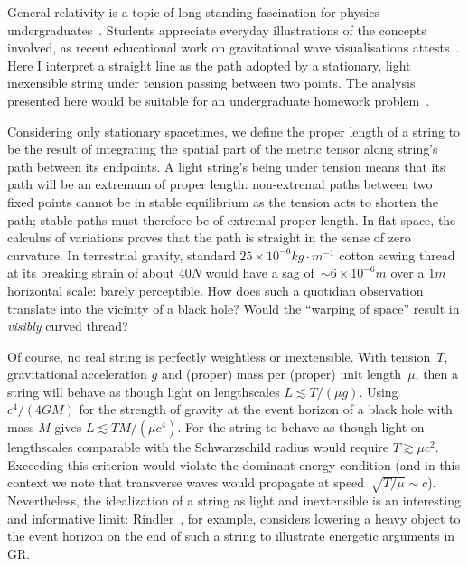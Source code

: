 \documentclass{ws-tpe}
\begin{document}
General relativity is a topic of long-standing fascination for physics
undergraduates~\cite{christensen2012}.  Students appreciate everyday
illustrations of the concepts involved, as recent educational work on
gravitational wave visualisations attests~\cite{overduin2018}.  Here I
interpret a straight line as the path adopted by a stationary, light
inexensible string under tension passing between two points.  The
analysis presented here would be suitable for an undergraduate
homework problem~\cite{romano2019}.

Considering only stationary spacetimes, we define the proper length of
a string to be the result of integrating the spatial part of the
metric tensor along string's path between its endpoints.  A light
string's being under tension means that its path will be an extremum
of proper length: non-extremal paths between two fixed points cannot
be in stable equilibrium as the tension acts to shorten the path;
stable paths must therefore be of extremal proper-length.  In flat
space, the calculus of variations proves that the path is straight in
the sense of zero curvature.  In terrestrial gravity, standard
$25\times 10^{-6}\unit{kg}\cdot\unit{m}^{-1}$ cotton sewing thread at
its breaking strain of about $40\unit{N}$ would have a sag of~${\sim}
6\times 10^{-6}\unit{m}$ over a $1\unit{m}$ horizontal scale: barely
perceptible.  How does such a quotidian observation translate into the
vicinity of a black hole?  Would the ``warping of space'' result in
{\em visibly} curved thread?

Of course, no real string is perfectly weightless or inextensible.
With tension~$T$, gravitational acceleration $g$ and (proper) mass per
(proper) unit length~$\mu$, then a string will behave as though light
on lengthscales $L\lesssim T/\left(\mu g\right)$.  Using
$c^4/\left(4GM\right)$ for the strength of gravity at the event
horizon of a black hole with mass $M$ gives $L\lesssim TM/\left(\mu
c^4\right)$.  For the string to behave as though light on lengthscales
comparable with the Schwarzschild radius would require $T\gtrsim\mu
c^2$.  Exceeding this criterion would violate the dominant energy
condition (and in this context we note that transverse waves would
propagate at speed~$\sqrt{T/\mu}\sim c$).  Nevertheless, the
idealization of a string as light and inextensible is an interesting
and informative limit: Rindler~\cite{rindler}, for example, considers
lowering a heavy object to the event horizon on the end of such a
string to illustrate energetic arguments in GR.
\end{document}

